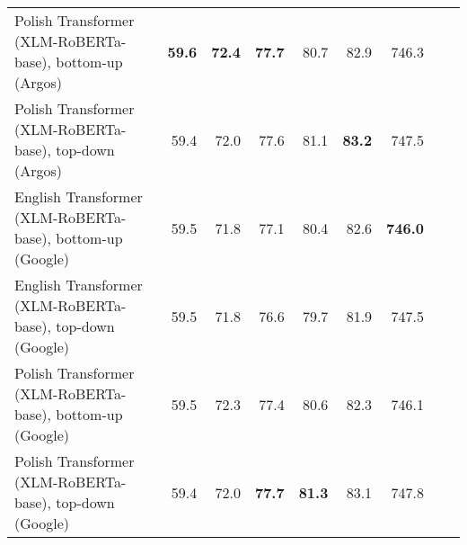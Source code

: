 \begin{table}[ht!]
{\begin{tabular}{lrrrrrrrr}
  Polish Transformer (XLM-RoBERTa-base), bottom-up (Argos) & \textbf{59.6} & \textbf{72.4} & \textbf{77.7} & 80.7 & 82.9 & 746.3 \\ 
  Polish Transformer (XLM-RoBERTa-base), top-down (Argos) & 59.4 & 72.0 & 77.6 & 81.1 & \textbf{83.2} & 747.5 \\ 
  English Transformer (XLM-RoBERTa-base), bottom-up (Google) & 59.5 & 71.8 & 77.1 & 80.4 & 82.6 & \textbf{746.0} \\ 
  English Transformer (XLM-RoBERTa-base), top-down (Google) & 59.5 & 71.8 & 76.6 & 79.7 & 81.9 & 747.5 \\ 
  Polish Transformer (XLM-RoBERTa-base), bottom-up (Google) & 59.5 & 72.3 & 77.4 & 80.6 & 82.3 & 746.1 \\ 
  Polish Transformer (XLM-RoBERTa-base), top-down (Google) & 59.4 & 72.0 & \textbf{77.7} & \textbf{81.3} & 83.1 & 747.8 \\ 
   \hline
\end{tabular}
}
\end{table}




